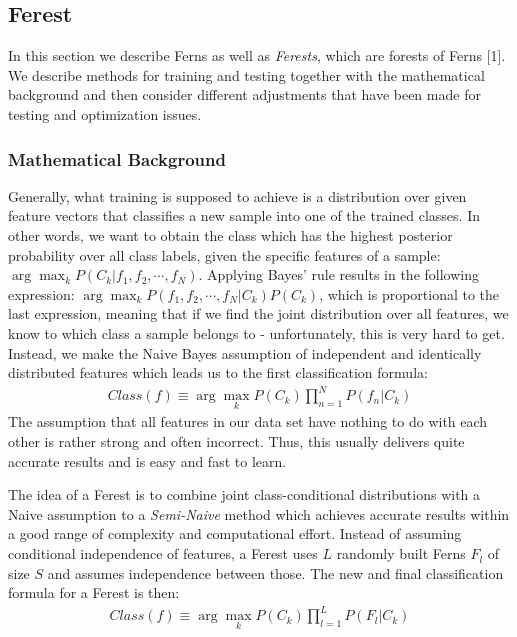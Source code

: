 \documentclass[twocolumn]{article}
\begin{document}
\subsection{Ferest}

In this section we describe Ferns as well as \textit{Ferests}, which are forests of Ferns [1]. We describe methods for training and testing together with the mathematical background and then consider different adjustments that have been made for testing and optimization issues.\\

\subsubsection{Mathematical Background}

Generally, what training is supposed to achieve is a distribution over given feature vectors that classifies a new sample into one of the trained classes. In other words, we want to obtain the class which has the highest posterior probability over all class labels, given the specific features of a sample: $\arg\max_k P(C_k \vert f_1,f_2, \cdots ,f_N)$. Applying Bayes' rule results in the following expression: $\arg\max_k P(f_1,f_2, \cdots ,f_N \vert C_k)P(C_k)$, which is proportional to the last expression, meaning that if we find the joint distribution over all features, we know to which class a sample belongs to - unfortunately, this is very hard to get. Instead, we make the Naive Bayes assumption of independent and identically distributed features which leads us to the first classification formula:
\begin{align*}
Class(f) \equiv \arg\max_k P(C_k) \prod_{n=1}^N P(f_n\vert C_k)
\end{align*}
The assumption that all features in our data set have nothing to do with each other is rather strong and often incorrect. Thus, this usually delivers quite accurate results and is easy and fast to learn.

The idea of a Ferest is to combine joint class-conditional distributions with a Naive assumption to a \textit{Semi-Naive} method which achieves accurate results within a good range of complexity and computational effort. Instead of assuming conditional independence of features, a Ferest uses $L$ randomly built Ferns $F_l$ of size $S$ and assumes independence between those. The new and final classification formula for a Ferest is then:
\begin{align*}
Class(f) \equiv \arg\max_k P(C_k) \prod_{l=1}^L P(F_l\vert C_k)
\end{align*}
\end{document}
